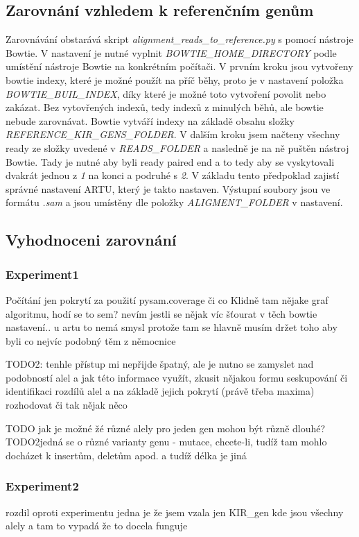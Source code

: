 \documentclass[czech,DP]{thesiskiv}
\numberwithin{equation}{section}
\begin{document}
\subsection{Zarovnání vzhledem k referenčním genům}
Zarovnávání obstarává skript \textit{alignment\_reads\_to\_reference.py} s pomocí nástroje Bowtie. V nastavení je nutné vyplnit \textit{BOWTIE\_HOME\_DIRECTORY} podle umístění nástroje Bowtie na konkrétním počítači. V prvním kroku jsou vytvořeny bowtie indexy, které je možné použít na příč běhy, proto je v nastavení položka \textit{BOWTIE\_BUIL\_INDEX}, díky které je možné toto vytvoření povolit nebo zakázat. Bez vytovřených indexů, tedy indexů z minulých běhů, ale bowtie nebude zarovnávat. Bowtie vytváří indexy na základě obsahu složky \textit{REFERENCE\_KIR\_GENS\_FOLDER}. V dalším kroku jsem načteny všechny ready ze složky uvedené v \textit{READS\_FOLDER} a nasledně je na ně puštěn nástroj Bowtie. Tady je nutné aby byli ready paired end a to tedy aby se vyskytovali dvakrát jednou z \textit{1} na konci a podruhé s \textit{2}. V základu tento předpoklad zajistí správné nastavení ARTU, který je takto nastaven. Výstupní soubory jsou ve formátu \textit{.sam} a jsou umístěny dle položky \textit{ALIGMENT\_FOLDER} v nastavení. 

\subsection{Vyhodnoceni zarovnání}

\subsubsection{Experiment1}
	Počítání jen pokrytí za použití pysam.coverage či co 
	Klidně tam nějake graf algoritmu, hodí se to sem? 
	nevím jestli se nějak víc šťourat v těch bowtie nastavení.. u artu to nemá smysl protože tam se hlavně musím držet toho aby byli co nejvíc podobný těm z němocnice
	
TODO2: tenhle přístup mi nepřijde špatný, ale je nutno se zamyslet nad podobností alel a jak této informace využít, zkusit nějakou formu seskupování či identifikaci rozdílů alel a na základě jejich pokrytí (právě třeba maxima) rozhodovat či tak nějak něco

TODO jak je možné žé různé alely pro jeden gen mohou být různě dlouhé?
TODO2jedná se o různé varianty genu - mutace, chcete-li, tudíž tam mohlo docházet k insertům, deletům apod. a tudíž délka je jiná

\subsubsection{Experiment2}
rozdil oproti experimentu jedna je že jsem vzala jen KIR\_gen kde jsou všechny alely a tam to vypadá že to docela funguje
\end{document}
